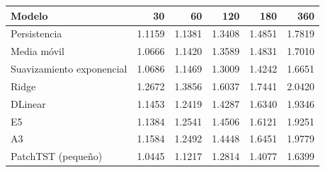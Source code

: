 \begin{tabular}{lrrrrr}
\toprule
Modelo & 30 & 60 & 120 & 180 & 360 \\
\midrule
Persistencia & 1.1159 & 1.1381 & 1.3408 & 1.4851 & 1.7819 \\
Media móvil & 1.0666 & 1.1420 & 1.3589 & 1.4831 & 1.7010 \\
Suavizamiento exponencial & 1.0686 & 1.1469 & 1.3009 & 1.4242 & 1.6651 \\
Ridge & 1.2672 & 1.3856 & 1.6037 & 1.7441 & 2.0420 \\
DLinear & 1.1453 & 1.2419 & 1.4287 & 1.6340 & 1.9346 \\
E5 & 1.1384 & 1.2541 & 1.4506 & 1.6121 & 1.9251 \\
A3 & 1.1584 & 1.2492 & 1.4448 & 1.6451 & 1.9779 \\
PatchTST (pequeño) & 1.0445 & 1.1217 & 1.2814 & 1.4077 & 1.6399 \\
\bottomrule
\end{tabular}
